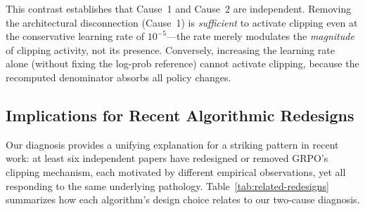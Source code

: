 This contrast establishes that Cause~1 and Cause~2 are independent.
Removing the architectural disconnection (Cause~1) is \emph{sufficient} to activate clipping even at the conservative learning rate of $10^{-5}$---the rate merely modulates the \emph{magnitude} of clipping activity, not its presence.
Conversely, increasing the learning rate alone (without fixing the log-prob reference) cannot activate clipping, because the recomputed denominator absorbs all policy changes.


\subsection{Implications for Recent Algorithmic Redesigns}
\label{sec:implications}

Our diagnosis provides a unifying explanation for a striking pattern in recent work: at least six independent papers have redesigned or removed GRPO's clipping mechanism, each motivated by different empirical observations, yet all responding to the same underlying pathology.
Table~\ref{tab:related-redesigns} summarizes how each algorithm's design choice relates to our two-cause diagnosis.

